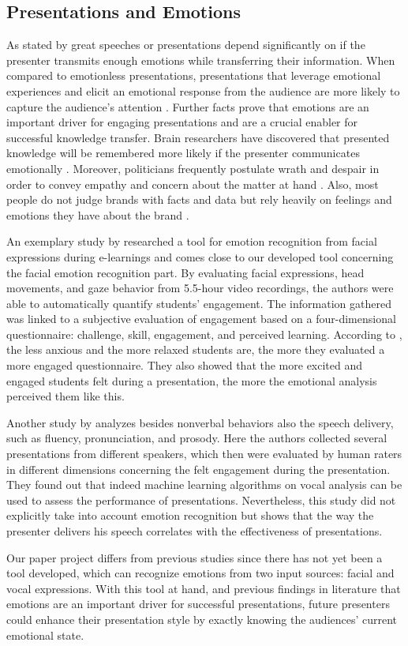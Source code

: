 \subsection{Presentations and Emotions}
\label{subsec:related_work_presentations_and_emotions}
As stated by  great speeches or presentations depend significantly on if the presenter transmits enough emotions while transferring their information. When compared to emotionless presentations, presentations that leverage emotional experiences and elicit an emotional response from the audience are more likely to capture the audience's attention \cite{gallo_talk_2014}. Further facts prove that emotions are an important driver for engaging presentations and are a crucial enabler for successful knowledge transfer. Brain researchers have discovered that presented knowledge will be remembered more likely if the presenter communicates emotionally \cite{tyng_influences_2017}. Moreover, politicians frequently postulate wrath and despair in order to convey empathy and concern about the matter at hand \cite{derrico_tracking_2019}. Also, most people do not judge brands with facts and data but rely heavily on feelings and emotions they have about the brand \cite{damasio_descartes_2006}.

An exemplary study by  researched a tool for emotion recognition from facial expressions during e-learnings and comes close to our developed tool concerning the facial emotion recognition part. By evaluating facial expressions, head movements, and gaze behavior from 5.5-hour video recordings, the authors were able to automatically quantify students’ engagement. The information gathered was linked to a subjective evaluation of engagement based on a four-dimensional questionnaire: challenge, skill, engagement, and perceived learning. According to , the less anxious and the more relaxed students are, the more they evaluated a more engaged questionnaire. They also showed that the more excited and engaged students felt during a presentation, the more the emotional analysis perceived them like this.

Another study by  analyzes besides nonverbal behaviors also the speech delivery, such as fluency, pronunciation, and prosody. Here the authors collected several presentations from different speakers, which then were evaluated by human raters in different dimensions concerning the felt engagement during the presentation. They found out that indeed machine learning algorithms on vocal analysis can be used to assess the performance of presentations. Nevertheless, this study did not explicitly take into account emotion recognition but shows that the way the presenter delivers his speech correlates with the effectiveness of presentations.

Our paper project differs from previous studies since there has not yet been a tool developed, which can recognize emotions from two input sources: facial and vocal expressions. With this tool at hand, and previous findings in literature that emotions are an important driver for successful presentations, future presenters could enhance their presentation style by exactly knowing the audiences’ current emotional state.
